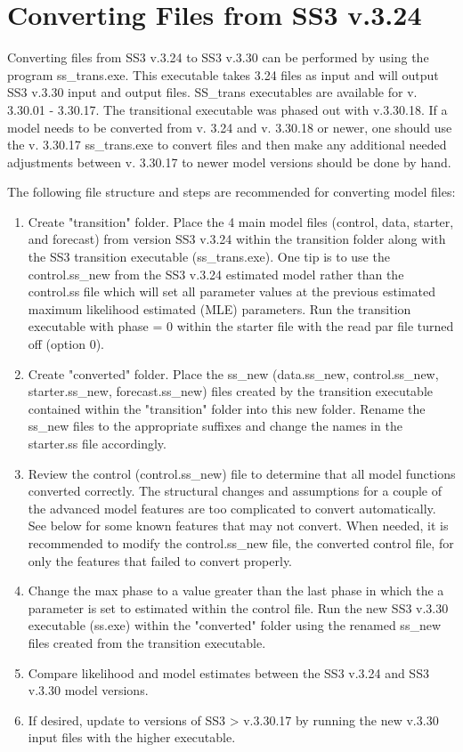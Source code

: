 \hypertarget{ConvIssues}{}
\section{Converting Files from SS3 v.3.24}
Converting files from SS3 v.3.24 to SS3 v.3.30 can be performed by using the program ss\_trans.exe. This executable takes 3.24 files as input and will output SS3 v.3.30 input and output files. SS\_trans executables are available for v. 3.30.01 - 3.30.17. The transitional executable was phased out with v.3.30.18. If a model needs to be converted from v. 3.24 and v. 3.30.18 or newer, one should use the v. 3.30.17 ss\_trans.exe to convert files and then make any additional needed adjustments between v. 3.30.17 to newer model versions should be done by hand.  

The following file structure and steps are recommended for converting model files:
\begin{enumerate}
	\item Create "transition" folder.  Place the 4 main model files (control, data, starter, and forecast) from version SS3 v.3.24 within the transition folder along with the SS3 transition executable (ss\_trans.exe).  One tip is to use the control.ss\_new from the SS3 v.3.24 estimated model rather than the control.ss file which will set all parameter values at the previous estimated maximum likelihood estimated (MLE) parameters.  Run the transition executable with phase = 0 within the starter file with the read par file turned off (option 0).
	
	\item Create "converted" folder.  Place the ss\_new (data.ss\_new, control.ss\_new, starter.ss\_new, forecast.ss\_new) files created by the transition executable contained within the "transition" folder into this new folder.  Rename the ss\_new files to the appropriate suffixes and change the names in the starter.ss file accordingly.
	
	\item Review the control (control.ss\_new) file to determine that all model functions converted correctly.  The structural changes and assumptions for a couple of the advanced model features are too complicated to convert automatically.  See below for some known features that may not convert. When needed, it is recommended to modify the control.ss\_new file, the converted control file, for only the features that failed to convert properly.
	
	\item Change the max phase to a value greater than the last phase in which the a parameter is set to estimated within the control file.  Run the new SS3 v.3.30 executable (ss.exe) within the "converted" folder using the renamed ss\_new files created from the transition executable.
	
	\item Compare likelihood and model estimates between the SS3 v.3.24 and SS3 v.3.30 model versions.
	
	\item If desired, update to versions of SS3 > v.3.30.17 by running the new v.3.30 input files with the higher executable.
\end{enumerate}

